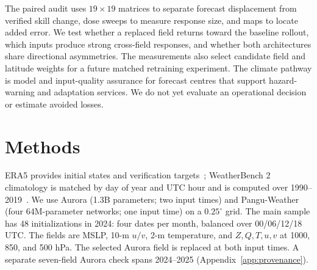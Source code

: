 \documentclass{article}
\begin{document}
The paired audit uses $19\!\times\!19$ matrices to separate forecast displacement from verified skill change, dose sweeps to measure response size, and maps to locate added error. We test whether a replaced field returns toward the baseline rollout, which inputs produce strong cross-field responses, and whether both architectures share directional asymmetries. The measurements also select candidate field and latitude weights for a future matched retraining experiment. The climate pathway is model and input-quality assurance for forecast centres that support hazard-warning and adaptation services. We do not yet evaluate an operational decision or estimate avoided losses.

\section{Methods}

ERA5 provides initial states and verification targets~\citep{hersbach2020era5}; WeatherBench 2 climatology is matched by day of year and UTC hour and is computed over 1990--2019~\citep{rasp2024weatherbench2}. We use Aurora (1.3B parameters; two input times) and Pangu-Weather (four 64M-parameter networks; one input time) on a $0.25^\circ$ grid. The main sample has 48 initializations in 2024: four dates per month, balanced over 00/06/12/18 UTC. The fields are MSLP, 10-m $u/v$, 2-m temperature, and $Z,Q,T,u,v$ at 1000, 850, and 500 hPa. The selected Aurora field is replaced at both input times. A separate seven-field Aurora check spans 2024--2025 (Appendix~\ref{app:provenance}).
\end{document}
